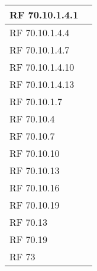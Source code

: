 {\begin{longtable} [c]{| p{2cm} | p{14cm} |}
RF 70.10.1.4.1 & \\ 
 \hline 
RF 70.10.1.4.4 & \\ 
 \hline 
RF 70.10.1.4.7 & \\ 
 \hline 
RF 70.10.1.4.10 & \\ 
 \hline 
RF 70.10.1.4.13 & \\ 
 \hline 
RF 70.10.1.7 & \\ 
 \hline 
RF 70.10.4 & \\ 
 \hline 
RF 70.10.7 & \\ 
 \hline 
RF 70.10.10 & \\ 
 \hline 
RF 70.10.13 & \\ 
 \hline 
RF 70.10.16 & \\ 
 \hline 
RF 70.10.19 & \\ 
 \hline 
RF 70.13 & \\ 
 \hline 
RF 70.19 & \\ 
 \hline 
RF 73 & \\ 
 \hline 
\end{longtable}}